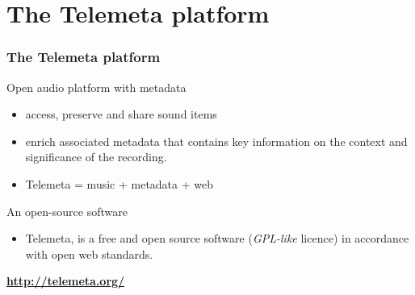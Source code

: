 \documentclass[final, hyperref, table]{beamer}
\begin{document}
\section[Telemeta]{The Telemeta platform}\label{sec:Telemeta}

\begin{frame}
  \frametitle{The Telemeta platform}
  \begin{block}{Open audio platform with metadata}
      \begin{itemize}
      \item \alert{access, preserve} and \alert{share} sound items
      \item enrich associated \alert{metadata} that
        contains key information on the context and significance of
        the recording.
      \item Telemeta = music + metadata + web
      \end{itemize}
    
  \end{block}
  \begin{block}{An open-source software}
    \begin{itemize}
    \item Telemeta, is a \alert{free and open source software} (\emph{GPL-like} licence)
       in accordance with \alert{open web standards}.
    \end{itemize}
    \vspace{-0.5cm}
    \begin{center}
\hspace{1cm}
      \colorbox{yellow!40}{\textbf{\url{http://telemeta.org/}}}
    \end{center}
  \end{block}
\end{frame}
\end{document}

